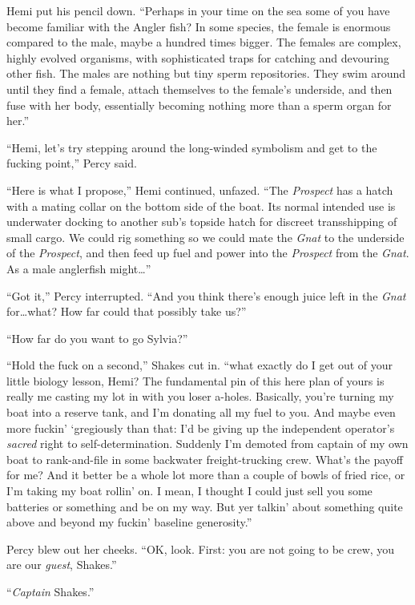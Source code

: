 \documentclass[
]{scrbook}
\begin{document}
Hemi put his pencil down. ``Perhaps in your time on the sea some of you
have become familiar with the Angler fish? In some species, the female
is enormous compared to the male, maybe a hundred times bigger. The
females are complex, highly evolved organisms, with sophisticated traps
for catching and devouring other fish. The males are nothing but tiny
sperm repositories. They swim around until they find a female, attach
themselves to the female's underside, and then fuse with her body,
essentially becoming nothing more than a sperm organ for her.''

``Hemi, let's try stepping around the long-winded symbolism and get to
the fucking point,'' Percy said.

``Here is what I propose,'' Hemi continued, unfazed. ``The
\emph{Prospect} has a hatch with a mating collar on the bottom side of
the boat. Its normal intended use is underwater docking to another sub's
topside hatch for discreet transshipping of small cargo. We could rig
something so we could mate the \emph{Gnat} to the underside of the
\emph{Prospect}, and then feed up fuel and power into the
\emph{Prospect} from the \emph{Gnat}. As a male anglerfish
might\ldots{}''

``Got it,'' Percy interrupted. ``And you think there's enough juice left
in the \emph{Gnat} for\ldots what? How far could that possibly take
us?''

``How far do you want to go Sylvia?''

``Hold the fuck on a second,'' Shakes cut in. ``what exactly do I get
out of your little biology lesson, Hemi? The fundamental pin of this
here plan of yours is really me casting my lot in with you loser
a-holes. Basically, you're turning my boat into a reserve tank, and I'm
donating all my fuel to you. And maybe even more fuckin' `gregiously
than that: I'd be giving up the independent operator's \emph{sacred}
right to self-determination. Suddenly I'm demoted from captain of my own
boat to rank-and-file in some backwater freight-trucking crew. What's
the payoff for me? And it better be a whole lot more than a couple of
bowls of fried rice, or I'm taking my boat rollin' on. I mean, I thought
I could just sell you some batteries or something and be on my way. But
yer talkin' about something quite above and beyond my fuckin' baseline
generosity.''

Percy blew out her cheeks. ``OK, look. First: you are not going to be
crew, you are our \emph{guest}, Shakes.''

``\emph{Captain} Shakes.''
\end{document}
